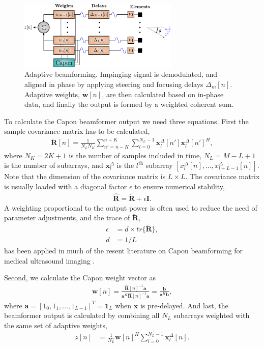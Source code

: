 \documentclass[conference]{IEEEtran}
\newcommand{\mat}[1]{\mathbf{#1}}
\renewcommand{\vec}[1]{\mathbf{#1}}
\begin{document}
\begin{figure}
\centerline{\includegraphics[width=3in]{gfx/beamforming_mv.pdf}}
\caption{Adaptive beamforming. Impinging signal is demodulated, and aligned in phase by applying steering and focusing delays $\Delta_m[n]$. Adaptive weights, $\vec{w}[n]$, are then calculated based on in-phase data, and finally the output is formed by a weighted coherent sum.}
\label{fig:mvbf}
\end{figure}

To calculate the Capon beamformer output we need three equations. First the sample covariance matrix has to be calculated,
\begin{align}
\mat{\breve{R}}[n] = \frac{1}{N_LN_K}\sum_{n'=n-K}^{n+K} \sum_{l=0}^{N_L-1} \vec{x}_l^{\Delta}[n']\vec{x}_l^{\Delta}[n']^H,\label{eq:R}
\end{align}
where  $N_K = 2K + 1$ is the number of samples included in time, $N_L = M-L+1$ is the number of subarrays, and $\vec{x}_l^{\Delta}$ is the $l^\text{th}$ subarray $[x_l^{\Delta}[n], \dotso, x_{l+L-1}^{\Delta}[n]]$. Note that the dimension of the covariance matrix is $L \times L$. The covariance matrix is usually loaded with a diagonal factor $\epsilon$ to ensure numerical stability, 
\begin{align}\label{eq:diag}
\mat{\hat{R}} = \mat{\breve{R}} + \epsilon\mat{I}.
\end{align}
A weighting proportional to the output power is often used to reduce the need of parameter adjustments, and the trace of $\mat{\breve{R}}$, 
\begin{align}\label{eq:diag_adapt}
\epsilon &= d \times tr\{\mat{\breve{R}}\}, \\
d &= 1/L
\end{align}
has been applied in much of the resent literature on Capon beamforming for medical ultrasound imaging \cite{Synnevag2007, Mehdizadeh2012}.

Second, we calculate the Capon weight vector as
\begin{align}\label{eq:w}
\vec{w}[n] = \frac{\mat{\hat{R}}[n]^{-1}\vec{a}}{\vec{a}^H\mat{\hat{R}}[n]^{-1}\vec{a}} = \frac{\vec{b}}{\vec{a}^H\vec{b}},
\end{align}
where $\vec{a} = [1_0, 1_1, ..., 1_{L-1}]^T = \vec{1}_L$ when $\vec{x}$ is pre-delayed. 
And last, the beamformer output is calculated by combining all $N_L$ subarrays weighted with the same set of adaptive weights,
\begin{align}
z[n] &= \frac{1}{N_L}\vec{w}[n]^H \sum_{l=0}^{N_L-1} \vec{x}_l^{\Delta}[n]. \label{eq:z_mv}
\end{align}
\end{document}
